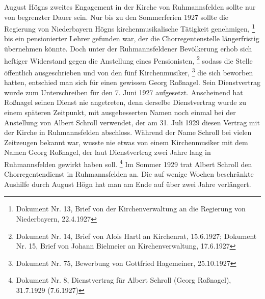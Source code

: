 \documentclass[a4paper]{article}
\begin{document}
August Högns zweites Engagement in der Kirche von Ruhmannsfelden sollte
nur von begrenzter Dauer sein. Nur bis zu den Sommerferien 1927 sollte
die Regierung von Niederbayern Högns kirchenmusikalische Tätigkeit
genehmigen, \footnote{Dokument Nr. 13, Brief von der Kirchenverwaltung
an die Regierung von Niederbayern, 22.4.1927} bis ein pensionierter
Lehrer gefunden war, der die Chorregentenstelle längerfristig
übernehmen könnte. Doch unter der Ruhmannsfeldener Bevölkerung erhob
sich heftiger Widerstand gegen die Anstellung eines
Pensionisten, \footnote{Dokument Nr. 14, Brief von Alois Hartl an
Kirchenrat, 15.6.1927; Dokument Nr. 15, Brief von Johann Bielmeier an
Kirchenverwaltung, 17.6.1927} sodass die Stelle öffentlich
ausgeschrieben und von den fünf Kirchenmusiker, \footnote{Dokument Nr.
75, Bewerbung von Gottfried Hagemeiner, 25.10.1927} die sich beworben
hatten, entschied man sich für einen gewissen Georg Roßnagel. Sein
Dienstvertrag wurde zum Unterschreiben für den 7. Juni 1927 aufgesetzt.
Anscheinend hat Roßnagel seinen Dienst nie angetreten, denn derselbe
Dienstvertrag wurde zu einem späteren Zeitpunkt, mit ausgebesserten
Namen noch einmal bei der Anstellung von Albert Schroll verwendet, der
am 31. Juli 1929 diesen Vertrag mit der Kirche in Ruhmannsfelden
abschloss. Während der Name Schroll bei vielen Zeitzeugen bekannt war,
wusste nie etwas von einem Kirchenmusiker mit dem Namen Georg Roßnagel,
der laut Dienstvertrag zwei Jahre lang in Ruhmannsfelden gewirkt haben
soll. \footnote{Dokument Nr. 8, Dienstvertrag für Albert Schroll (Georg
Roßnagel), 31.7.1929 (7.6.1927)} Im Sommer 1929 trat Albert Schroll den
Chorregentendienst in Ruhmannsfelden an. Die auf wenige Wochen
beschränkte Aushilfe durch August Högn hat man am Ende auf über zwei
Jahre verlängert.
\end{document}
